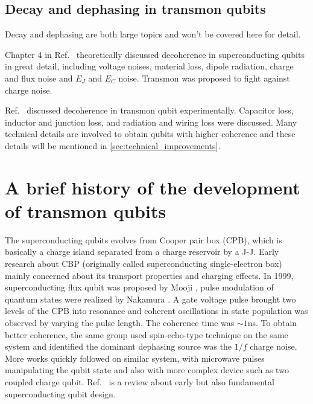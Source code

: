         

    \subsection{Decay and dephasing in transmon qubits} %
    \label{sub:decay_and_dephasing_in_transmon_qubits}

    Decay and dephasing are both large topics and won't be covered here for detail.

    Chapter 4 in Ref.~ theoretically discussed decoherence in superconducting qubits in great detail, including voltage noises, material loss, dipole radiation, charge and flux noise and $E_J$ and $E_C$ noise. Transmon was proposed to fight against charge noise.

    Ref.~ discussed decoherence in transmon qubit experimentally. Capacitor loss, inductor and junction loss, and radiation and wiring loss were discussed. Many technical details are involved to obtain qubits with higher coherence and these details will be mentioned in \ref{sec:technical_improvements}.
    
    



\section{A brief history of the development of transmon qubits} %
\label{sec:history_of_the_development_of_transmon_qubit}

The superconducting qubits evolves from Cooper pair box (CPB), which is basically a charge island separated from a charge reservoir by a J-J. Early research about CBP (originally called superconducting single-electron box\cite{Nakamura1997}) mainly concerned about its transport properties and charging effects. In 1999, superconducting flux qubit was proposed by Mooji \etal{}\cite{Mooij1999}, pulse modulation of quantum states were realized by Nakamura \etal\cite{Nakamura1999}. A gate voltage pulse brought two levels of the CPB into resonance and coherent oscillations in state population was observed by varying the pulse length. The coherence time was $\sim 1$ns. To obtain better coherence, the same group used spin-echo-type technique on the same system and identified the dominant dephasing source was the $1/f$ charge noise\cite{Nakamura2002}. More works quickly followed on similar system, with microwave pulses manipulating the qubit state\cite{Vion2002,Collin2004} and also with more complex device such as two coupled charge qubit\cite{Pashkin2003}. Ref.~ is a review about early but also fundamental superconducting qubit design.


